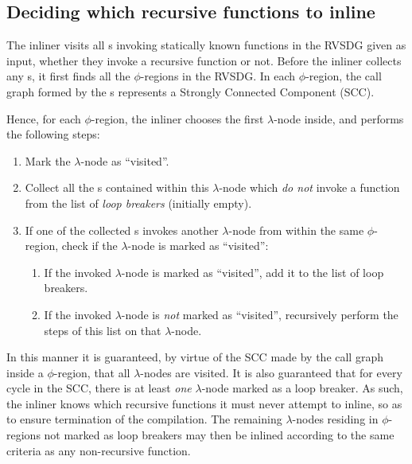 \subsection{Deciding which recursive functions to inline}
\label{sub:scheme:inlining_recur_apply_nodes}

The inliner visits all \applyNode s invoking statically known functions in the
RVSDG given as input, whether they invoke a recursive function or not. Before
the inliner collects any \applyNode s, it first finds all the $\phi$-regions in
the RVSDG. In each $\phi$-region, the call graph formed by the \applyNode s
represents a Strongly Connected Component (SCC).

Hence, for each $\phi$-region, the inliner chooses the first $\lambda$-node
inside, and performs the following steps:

\begin{enumerate}
	\item Mark the $\lambda$-node as ``visited''.

	\item Collect all the \applyNode s contained within this $\lambda$-node
which \textit{do not} invoke a function from the list of \textit{loop breakers}
(initially empty).

	\item If one of the collected \applyNode s invokes another $\lambda$-node
from within the same $\phi$-region, check if the $\lambda$-node is marked as
``visited'':
	\begin{enumerate}
		\item If the invoked $\lambda$-node is marked as ``visited'', add it to
the list of loop breakers.

		\item If the invoked $\lambda$-node is \textit{not} marked as
``visited'', recursively perform the steps of this list on that $\lambda$-node.
	\end{enumerate}
\end{enumerate}

In this manner it is guaranteed, by virtue of the SCC made by the call graph
inside a $\phi$-region, that all $\lambda$-nodes are visited. It is also
guaranteed that for every cycle in the SCC, there is at least \textit{one}
$\lambda$-node marked as a loop breaker. As such, the inliner knows which
recursive functions it must never attempt to inline, so as to ensure termination
of the compilation. The remaining $\lambda$-nodes residing in $\phi$-regions not
marked as loop breakers may then be inlined according to the same criteria as
any non-recursive function.

